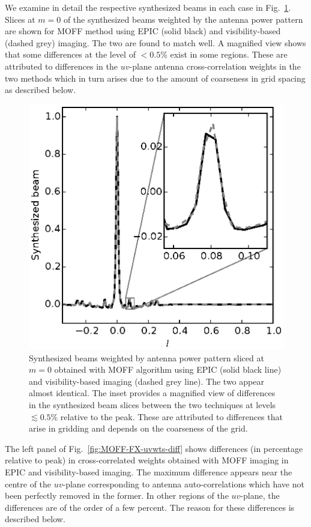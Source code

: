 \documentclass[a4paper,fleqn,usenatbib]{mnras}
\begin{document}
We examine in detail the respective synthesized beams in each case in Fig.~\ref{fig:MOFF-FX-psf-diff}. Slices at $m=0$ of the synthesized beams weighted by the antenna power pattern are shown for MOFF method using EPIC (solid black) and visibility-based (dashed grey) imaging. The two are found to match well. A magnified view shows that some differences at the level of $<0.5$\% exist in some regions. These are attributed to differences in the $uv$-plane antenna cross-correlation weights in the two methods which in turn arises due to the amount of coarseness in grid spacing as described below.

\begin{figure}
  \includegraphics[width=\columnwidth]{figure6}
  \caption{Synthesized beams weighted by antenna power pattern sliced at $m=0$ obtained with MOFF algorithm using EPIC (solid black line) and visibility-based imaging (dashed grey line). The two appear almost identical. The inset provides a magnified view of differences in the synthesized beam slices between the two techniques at levels $\lesssim 0.5$\% relative to the peak. These are attributed to differences that arise in gridding and depends on the coarseness of the grid.}
  \label{fig:MOFF-FX-psf-diff}
\end{figure}

The left panel of Fig.~\ref{fig:MOFF-FX-uvwts-diff} shows differences (in percentage relative to peak) in cross-correlated weights obtained with MOFF imaging in EPIC and visibility-based imaging. The maximum difference appears near the centre of the $uv$-plane corresponding to antenna auto-correlations which have not been perfectly removed in the former. In other regions of the $uv$-plane, the differences are of the order of a few percent. The reason for these differences is described below.
\end{document}
